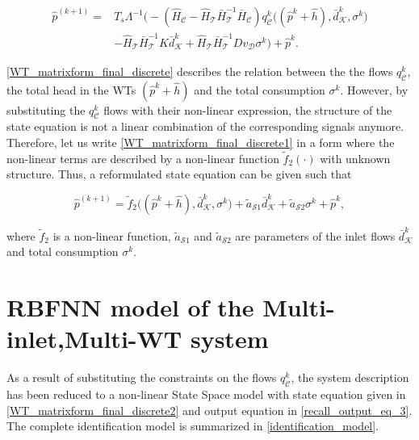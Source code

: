 \vspace{-4mm}
\begin{align}
\label{WT_matrixform_final_discrete1}
\nonumber  \hat{p}^{(k+1)}  =& T_s \Lambda^{-1} \big(- (\hat{H}_{\mathcal{C}} - \hat{H}_{\mathcal{T}} \bar{H}^{-1}_{\mathcal{T}}\bar{H}_{\mathcal{C}})  q^{k}_{\mathcal{C}}\big ((\hat{p}^{k} + \hat{h}),\bar{d}^{k}_{\mathcal{K}}, \sigma^{k} \big) \\ & - \hat{H}_{\mathcal{T}} \bar{H}^{-1}_{\mathcal{T}} K \bar{d}^{k}_{\mathcal{K}} + \hat{H}_{\mathcal{T}} \bar{H}^{-1}_{\mathcal{T}} D v_{\mathcal{D}} \sigma^{k} \big) + \hat{p}^{k} .
\end{align}
\vspace{-4mm}


\eqref{WT_matrixform_final_discrete} describes the relation between the the flows $q^{k}_{\mathcal{C}}$, the total head in the WTs $(\hat{p}^{k} + \hat{h})$ and the total consumption $\sigma^{k}$. However, by substituting the $q^{k}_{\mathcal{C}}$ flows with their non-linear expression, the structure of the state equation is not a linear combination of the corresponding signals anymore. Therefore, let us write \eqref{WT_matrixform_final_discrete1} in a form where the non-linear terms are described by a non-linear function $\tilde{f}_2(\cdot)$ with unknown structure. Thus, a reformulated state equation can be given such that

 \begin{equation}
  \label{WT_matrixform_final_discrete2}
     \hat{p}^{(k+1)}  = \tilde{f}_2 \big((\hat{p}^{k} + \hat{h}),\bar{d}^{k}_{\mathcal{K}}, \sigma^{k}\big) + \tilde{a}_{\mathcal{S}1} \bar{d}^{k}_{\mathcal{K}} + \tilde{a}_{\mathcal{S}2} \sigma^{k} + \hat{p}^{k},
\end{equation} 


where $\tilde{f}_2$ is a non-linear function, $\tilde{a}_{\mathcal{S}1}$ and $\tilde{a}_{\mathcal{S}2}$ are parameters of the inlet flows $\bar{d}^{k}_{\mathcal{K}}$ and total consumption $\sigma^{k}$. 


\section{RBFNN model of the Multi-inlet,Multi-WT system}
\label{RBFNN_model_multi_inlet_multi_WT_sys} 

As a result of substituting the constraints on the flows $q^{k}_{\mathcal{C}}$, the system description has been reduced to a non-linear State Space model with state equation given in \eqref {WT_matrixform_final_discrete2} and output equation in \eqref {recall_output_eq_3}. The complete identification model is summarized in \eqref{identification_model}. 

